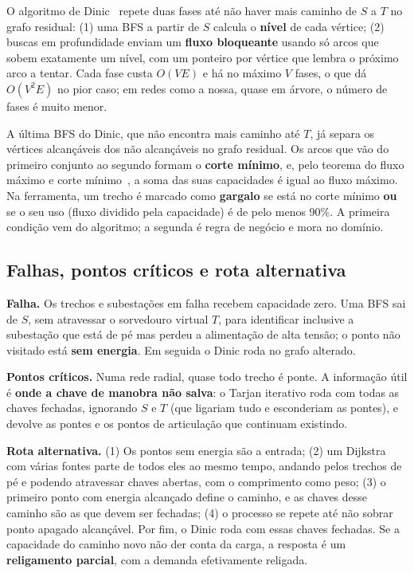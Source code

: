 \documentclass[12pt]{article}
\begin{document}
O algoritmo de Dinic~\cite{dinic1970} repete duas fases até não haver mais caminho de $S$ a $T$ no grafo residual: (1) uma BFS a partir de $S$ calcula o \textbf{nível} de cada vértice; (2) buscas em profundidade enviam um \textbf{fluxo bloqueante} usando só arcos que sobem exatamente um nível, com um ponteiro por vértice que lembra o próximo arco a tentar. Cada fase custa $O(VE)$ e há no máximo $V$ fases, o que dá $O(V^2E)$ no pior caso; em redes como a nossa, quase em árvore, o número de fases é muito menor.

A última BFS do Dinic, que não encontra mais caminho até $T$, já separa os vértices alcançáveis dos não alcançáveis no grafo residual. Os arcos que vão do primeiro conjunto ao segundo formam o \textbf{corte mínimo}, e, pelo teorema do fluxo máximo e corte mínimo~\cite{ford1956,cormen2009}, a soma das suas capacidades é igual ao fluxo máximo. Na ferramenta, um trecho é marcado como \textbf{gargalo} se está no corte mínimo \textbf{ou} se o seu uso (fluxo dividido pela capacidade) é de pelo menos 90\%. A primeira condição vem do algoritmo; a segunda é regra de negócio e mora no domínio.

\subsection{Falhas, pontos críticos e rota alternativa}

\textbf{Falha.} Os trechos e subestações em falha recebem capacidade zero. Uma BFS sai de $S$, sem atravessar o sorvedouro virtual $T$, para identificar inclusive a subestação que está de pé mas perdeu a alimentação de alta tensão; o ponto não visitado está \textbf{sem energia}. Em seguida o Dinic roda no grafo alterado.

\textbf{Pontos críticos.} Numa rede radial, quase todo trecho é ponte. A informação útil é \textbf{onde a chave de manobra não salva}: o Tarjan iterativo roda com todas as chaves fechadas, ignorando $S$ e $T$ (que ligariam tudo e esconderiam as pontes), e devolve as pontes e os pontos de articulação que continuam existindo.

\textbf{Rota alternativa.} (1) Os pontos sem energia são a entrada; (2) um Dijkstra com várias fontes parte de todos eles ao mesmo tempo, andando pelos trechos de pé e podendo atravessar chaves abertas, com o comprimento como peso; (3) o primeiro ponto com energia alcançado define o caminho, e as chaves desse caminho são as que devem ser fechadas; (4) o processo se repete até não sobrar ponto apagado alcançável. Por fim, o Dinic roda com essas chaves fechadas. Se a capacidade do caminho novo não der conta da carga, a resposta é um \textbf{religamento parcial}, com a demanda efetivamente religada.
\end{document}
